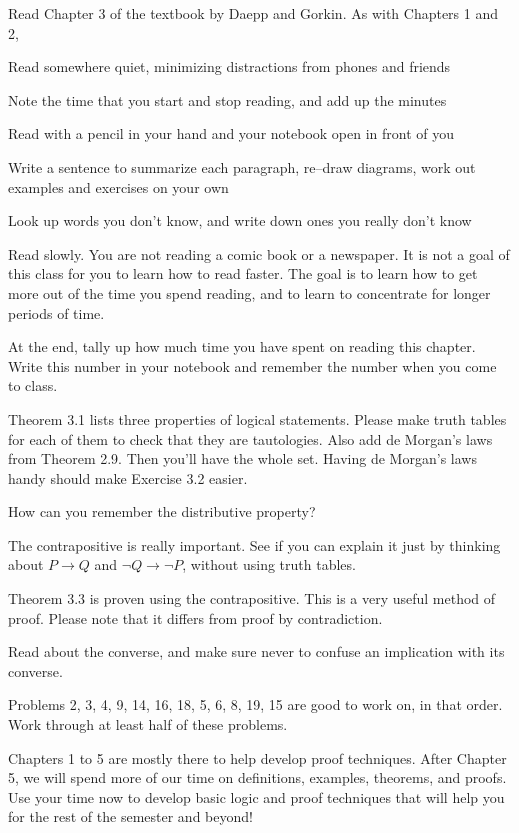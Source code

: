 
Read Chapter 3 of the textbook by Daepp and Gorkin.
As with Chapters 1 and 2,
\blist{0.0in}
\item Read somewhere quiet, minimizing distractions from phones and friends
\item Note the time that you start and stop reading, and add up the minutes
\item Read with a pencil in your hand and your notebook open in front of you
\item Write a sentence to summarize each paragraph, re--draw diagrams, work out examples and exercises on your own
\item Look up words you don't know, and write down ones you really don't know
\item Read slowly.  You are not reading a comic book or a newspaper.  It is not a goal of this class for you to learn how to read faster.  The goal is to learn how to get more out of the time you spend reading, and to learn to concentrate for longer periods of time.
\item At the end, tally up how much time you have spent on reading this chapter.
Write this number in your notebook and remember the number when you come to class.
\elist

Theorem 3.1 lists three properties of logical statements.
Please make truth tables for each of them to check that they are tautologies.
Also add de Morgan's laws from Theorem 2.9.
Then you'll have the whole set.
Having de Morgan's laws handy should make Exercise 3.2 easier.

How can you remember the distributive property?

The contrapositive is really important.
See if you can explain it just by thinking about $P \to Q$ and $\neg Q \to \neg P$, without using truth tables.

Theorem 3.3 is proven using the contrapositive.
This is a very useful method of proof.
Please note that it differs from proof by contradiction.

Read about the converse, and make sure never to confuse an implication with its converse.

Problems 2, 3, 4, 9, 14, 16, 18, 5, 6, 8, 19, 15 are good to work on, in that order.
Work through at least half of these problems.


Chapters 1 to 5 are mostly there to help develop proof techniques.  After Chapter 5, we will spend more of our time on definitions, examples, theorems, and proofs.
Use your time now to develop basic logic and proof techniques that will help you for the rest of the semester and beyond!


\vfill          %

